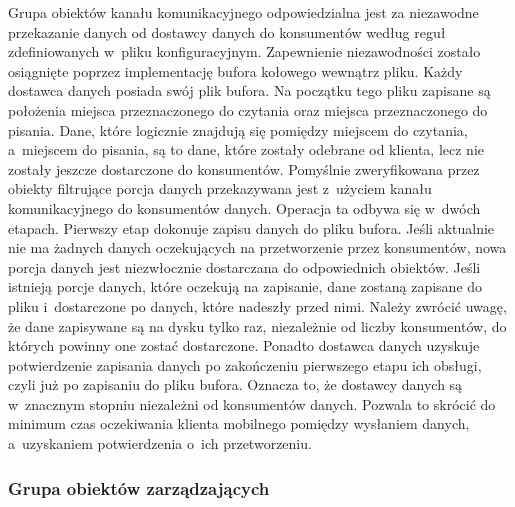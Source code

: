 Grupa obiektów kanału komunikacyjnego odpowiedzialna jest za
niezawodne przekazanie danych od dostawcy danych do konsumentów według
reguł zdefiniowanych w~pliku konfiguracyjnym. Zapewnienie
niezawodności zostało osiągnięte poprzez implementację bufora kołowego
wewnątrz pliku. Każdy dostawca danych posiada swój plik bufora. Na
początku tego pliku zapisane są położenia miejsca przeznaczonego do
czytania oraz miejsca przeznaczonego do pisania. Dane, które logicznie
znajdują się pomiędzy miejscem do czytania, a~miejscem do pisania, są
to dane, które zostały odebrane od klienta, lecz nie zostały jeszcze
dostarczone do konsumentów. Pomyślnie zweryfikowana przez obiekty
filtrujące porcja danych przekazywana jest z~użyciem kanału
komunikacyjnego do konsumentów danych. Operacja ta odbywa się w~dwóch
etapach. Pierwszy etap dokonuje zapisu danych do pliku bufora. Jeśli
aktualnie nie ma żadnych danych oczekujących na przetworzenie przez
konsumentów, nowa porcja danych jest niezwłocznie dostarczana do
odpowiednich obiektów. Jeśli istnieją porcje danych, które oczekują na
zapisanie, dane zostaną zapisane do pliku i~dostarczone po danych,
które nadeszły przed nimi. Należy zwrócić uwagę, że dane zapisywane są
na dysku tylko raz, niezależnie od liczby konsumentów, do których
powinny one zostać dostarczone. Ponadto dostawca danych uzyskuje
potwierdzenie zapisania danych po zakończeniu pierwszego etapu ich
obsługi, czyli już po zapisaniu do pliku bufora. Oznacza to, że dostawcy
danych są w~znacznym stopniu niezależni od konsumentów danych. Pozwala
to skrócić do minimum czas oczekiwania klienta mobilnego pomiędzy
wysłaniem danych, a~uzyskaniem potwierdzenia o~ich przetworzeniu.

\subsubsection[Grupa obiektów zarządzających][Grupa obiektów
zarządzających]{Grupa obiektów zarządzających}

